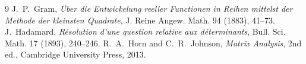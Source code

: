 \begin{thebibliography}{9}
 J.~P.~Gram, \emph{\"Uber die Entwickelung reeller Functionen in Reihen mittelst der Methode der kleinsten Quadrate}, J. Reine Angew. Math. 94 (1883), 41--73.
 J.~Hadamard, \emph{R\'esolution d'une question relative aux d\'eterminants}, Bull. Sci. Math. 17 (1893), 240--246.
 R.~A.~Horn and C.~R.~Johnson, \emph{Matrix Analysis}, 2nd ed., Cambridge University Press, 2013.
\end{thebibliography}
